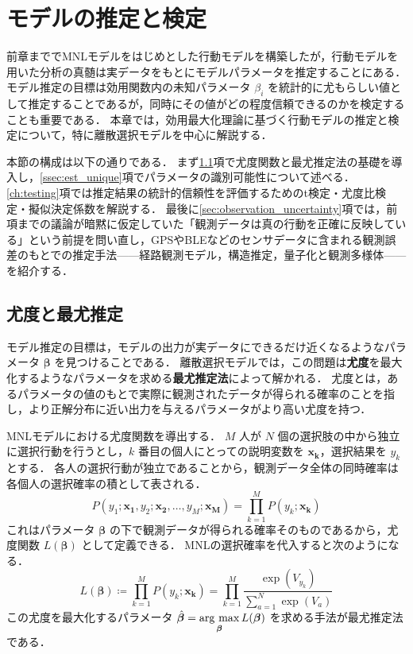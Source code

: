 
\section{モデルの推定と検定}\label{sec:estimation}
前章まででMNLモデルをはじめとした行動モデルを構築したが，行動モデルを用いた分析の真髄は実データをもとにモデルパラメータを推定することにある．
モデル推定の目標は効用関数内の未知パラメータ $\beta_i$ を統計的に尤もらしい値として推定することであるが，同時にその値がどの程度信頼できるのかを検定することも重要である．
本章では，効用最大化理論に基づく行動モデルの推定と検定について，特に離散選択モデルを中心に解説する．

本節の構成は以下の通りである．
まず\ref{sec:likelihood}項で尤度関数と最尤推定法の基礎を導入し，\ref{ssec:est_unique}項でパラメータの識別可能性について述べる．
\ref{ch:testing}項では推定結果の統計的信頼性を評価するためのt検定・尤度比検定・擬似決定係数を解説する．
最後に\ref{sec:observation_uncertainty}項では，前項までの議論が暗黙に仮定していた「観測データは真の行動を正確に反映している」という前提を問い直し，GPSやBLEなどのセンサデータに含まれる観測誤差のもとでの推定手法——経路観測モデル，構造推定，量子化と観測多様体——を紹介する．

\subsection{尤度と最尤推定}\label{sec:likelihood}
モデル推定の目標は，モデルの出力が実データにできるだけ近くなるようなパラメータ $\bm{\beta}$ を見つけることである．
離散選択モデルでは，この問題は\textbf{尤度}を最大化するようなパラメータを求める\textbf{最尤推定法}によって解かれる．
尤度とは，あるパラメータの値のもとで実際に観測されたデータが得られる確率のことを指し，より正解分布に近い出力を与えるパラメータがより高い尤度を持つ．

MNLモデルにおける尤度関数を導出する．
$M$ 人が $N$ 個の選択肢の中から独立に選択行動を行うとし，$k$ 番目の個人にとっての説明変数を $\bm{x_k}$，選択結果を $y_k$ とする．
各人の選択行動が独立であることから，観測データ全体の同時確率は各個人の選択確率の積として表される．
\begin{equation}
    \label{eq:joint_prob}
    P(y_1;\bm{x_1},y_2;\bm{x_2},\ldots,y_M;\bm{x_M}) = \prod_{k=1}^M P(y_k;\bm{x_k})
\end{equation}
これはパラメータ $\bm{\beta}$ の下で観測データが得られる確率そのものであるから，尤度関数 $L(\bm\beta)$ として定義できる．
MNLの選択確率を代入すると次のようになる．
\begin{equation}
    \label{eq:likelihood}
    L(\bm\beta) \coloneq \prod_{k=1}^M P(y_k;\bm{x_k}) = \prod_{k=1}^M\frac{\exp(V_{y_k})}{\sum_{a=1}^N \exp(V_a)}
\end{equation}
この尤度を最大化するパラメータ $\hat{\bm\beta} = \mathop{\rm arg~max}\limits_{\bm\beta} L(\bm\beta)$ を求める手法が最尤推定法である．

